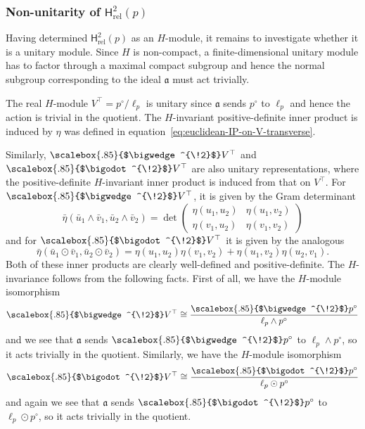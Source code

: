 \documentclass[11pt,reqno,a4paper,final]{amsart}
\newcommand\ext[1]{\scalebox{.85}{$\bigwedge^{\!#1}$}}
\newcommand\sym[1]{\scalebox{.85}{$\bigodot^{\!#1}$}}
\theoremstyle{plain}
\theoremstyle{definition}
\newcommand{\fa}{\mathfrak{a}}
\newcommand{\Hrel}{\mathsf{H}_{\mathrm{rel}}}
\newcommand{\1}{\mathbb{1}}
\numberwithin{equation}{section}
\begin{document}
\subsubsection{Non-unitarity of $\Hrel^2(p)$}
\label{sec:non-unitarity-hrel2p}

Having determined $\Hrel^2(p)$ as an $H$-module, it remains to
investigate whether it is a unitary module.  Since $H$ is non-compact,
a finite-dimensional unitary module has to factor through a maximal
compact subgroup and hence the normal subgroup corresponding to the
ideal $\fa$ must act trivially.

The real $H$-module $V^\top = p^\circ/\ell_p$ is unitary since $\fa$
sends $p^\circ$ to $\ell_p$ and hence the action is trivial in the
quotient.  The $H$-invariant positive-definite inner product is
induced by $\eta$ was defined in
equation~\eqref{eq:euclidean-IP-on-V-transverse}.

Similarly, $\ext{2}V^\top$ and $\sym{2}V^\top$ are also unitary
representations, where the positive-definite $H$-invariant inner
product is induced from that on $V^\top$.  For $\ext{2}V^ \top$, it is
given by the Gram determinant
\begin{equation}
  \label{eq:gram-det}
  \bar\eta(\bar u_1 \wedge \bar v_1, \bar u_2 \wedge \bar v_2) =
  \det
  \begin{pmatrix}
    \eta(u_1,u_2) & \eta(u_1,v_2) \\
    \eta(v_1,u_2) & \eta(v_1,v_2)
  \end{pmatrix}
\end{equation}
and for $\sym{2}V^\top$ it is given by the analogous
\begin{equation}
  \bar\eta(\bar u_1 \odot \bar v_1, \bar u_2 \odot \bar v_2)=
  \eta(u_1,u_2) \eta(v_1,v_2) + \eta(u_1,v_2) \eta(u_2,v_1).
\end{equation}
Both of these inner products are clearly well-defined and
positive-definite.  The $H$-invariance follows from the following
facts.  First of all, we have the $H$-module isomorphism
\begin{equation}
  \ext{2}V^\top \cong \dfrac{\ext{2}p^\circ}{\ell_p \wedge p^\circ}
\end{equation}
and we see that $\fa$ sends $\ext{2}p^\circ$ to
$\ell_p \wedge p^\circ$, so it acts trivially in the quotient.
Similarly, we have the $H$-module isomorphism
\begin{equation}
  \sym{2}V^\top \cong \dfrac{\sym{2}p^\circ}{\ell_p \odot p^\circ}
\end{equation}
and again we see that  $\fa$ sends $\sym{2}p^\circ$ to
$\ell_p \odot p^\circ$, so it acts trivially in the quotient.
\end{document}
